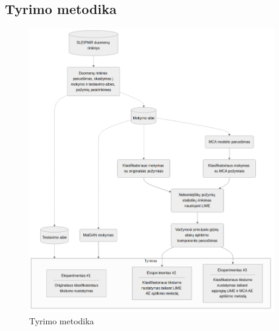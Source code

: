 
\subsection{Tyrimo metodika}

\begin{figure}[h]
    \centering
    \includegraphics[width=0.95\textwidth]{images/methodology.png}
    \caption{Tyrimo metodika}
    \label{fig:methodology}
\end{figure}


